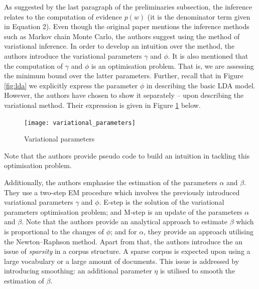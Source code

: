 \documentclass{mprop}
\begin{document}
\par As suggested by the last paragraph of the preliminaries subsection, the inference relates to the computation of evidence $p(w)$ (it is the denominator term given in Equation 2). Even though the original paper mentions the inference methods such as Markov chain Monte Carlo, the authors suggest using the method of variational inference. In order to develop an intuition over the method, the authors introduce the variational parameters $\gamma$ and $\phi$. It is also mentioned that the computation of $\gamma$ and $\phi$ is an optimisation problem. That is, we are assessing the minimum bound over the latter parameters. Further, recall that in Figure \ref{fig:lda} we explicitly express the parameter $\phi$ in describing the basic LDA model. However, the authors have chosen to show it separately -- upon describing the variational method. Their expression is given in Figure \ref{fig:var_par} below.
\begin{figure}[H]
  \centering
  \texttt{[image: variational\_parameters]}
  \caption{Variational parameters}
  \label{fig:var_par}
\end{figure}
Note that the authors provide pseudo code to build an intuition in tackling this optimisation problem.

\par Additionally, the authors emphasise the estimation of the parameters $\alpha$ and $\beta$. They use a two-step EM procedure which involves the previously introduced variational parameters $\gamma$ and $\phi$. E-step is the solution of the variational parameters optimisation problem; and M-step is an update of the parameters $\alpha$ and $\beta$. Note that the authors provide an analytical approach to estimate $\beta$ which is proportional to the changes of $\phi$; and for $\alpha$, they provide an approach utilising the Newton--Raphson method. Apart from that, the authors introduce the an issue of \textit{sparsity} in a corpus structure. A sparse corpus is expected upon using a large vocabulary or a large amount of documents. This issue is addressed by introducing smoothing: an additional parameter $\eta$ is utilised to smooth the estimation of $\beta$. 
\end{document}
